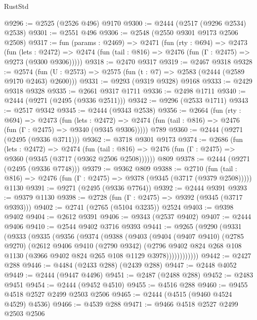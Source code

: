 \begin{lexlean}{RustStd}
\begin{coremodule}
@9296 := @2525 (@2526 @496) @9170
@9300 := @2444 (@2517 (@9296 @2534) @2538)
@9301 := @2551 @496
@9306 := @2548 (@2550 @9301 @9173 @2506 @2508)
@9317 := fun (params : @2469) =>
  @2471
    (fun (rty : @694) =>
    @2473
      (fun (lets : @2472) =>
      @2474 (fun (tail : @816) => @2476 (fun (Γ : @2475) => @9273 (@9300 @9306)))))
@9318 := @2470 @9317
@9319 := @2467 @9318
@9328 := @2574 (fun (U : @2573) => @2575 (fun (t : @7) => @2583 (@2444 (@2589 @9170 @2463) @2600)))
@9331 := @9293 (@9319 @9328) @9168
@9333 := @2429 @9318 @9328
@9335 := @2661 @9317 @1711
@9336 := @2498 @1711
@9340 := @2444 (@9271 (@2495 (@9336 @2511)))
@9342 := @9296 (@2533 @1711)
@9343 := @2517 @9342
@9345 := @2444 (@9343 @2538)
@9356 := @2664
    (fun (rty : @694) =>
    @2473
      (fun (lets : @2472) =>
      @2474 (fun (tail : @816) => @2476 (fun (Γ : @2475) => @9340 (@9345 @9306)))))
    @789
@9360 := @2444 (@9271 (@2495 (@9336 @3711)))
@9362 := @3718 @9301 @9173
@9374 := @2686
    (fun (lets : @2472) =>
    @2474
      (fun (tail : @816) => @2476 (fun (Γ : @2475) => @9360 (@9345 (@3717 (@9362 @2506 @2508))))))
    @809
@9378 := @2444 (@9271 (@2495 (@9336 @7748)))
@9379 := @9362 @809
@9388 := @2710
    (fun (tail : @816) => @2476 (fun (Γ : @2475) => @9378 (@9345 (@3717 (@9379 @2508)))))
    @1130
@9391 := @9271 (@2495 (@9336 @7764))
@9392 := @2444 @9391
@9393 := @9379 @1130
@9398 := @2728 (fun (Γ : @2475) => @9392 (@9345 (@3717 @9393)))
@9402 := @2741 (@2765 (@5104 @3235)) @2524
@9403 := @9398 @9402
@9404 := @2612 @9391
@9406 := @9343 (@2537 @9402)
@9407 := @2444 @9406
@9410 := @2544 @9402 @3716 @9393
@9441 := @9265
    (@9290
      (@9331
        (@9333
          (@9335
            (@9356
              (@9374
                (@9388
                  (@9403
                    (@9404
                      (@9407 @9410)
                      (@2785 @9270)
                      (@2612
                        @9406
                        @9410
                        (@2790 @9342)
                        (@2796
                          @9402
                          @824
                          @268
                          @108
                          @1130
                          (@3966 @9402 @824 @265 @108 @1129 @3978))))))))))))
@9442 := @2427 @288
@9446 := @4484 (@2433 @288) (@2439 @288)
@9447 := @2448 @4052
@9449 := @2444 (@9447 @4496)
@9451 := @2487 (@2488 @288)
@9452 := @2483 @9451
@9454 := @2444 (@9452 @4510)
@9455 := @4516 @288
@9460 := @9455 @4518 @2527 @2499 @2503 @2506
@9465 := @2444 (@4515 (@9460 @4524 @4529) @4536)
@9466 := @4539 @288
@9471 := @9466 @4518 @2527 @2499 @2503 @2506

\end{coremodule}
\end{lexlean}
